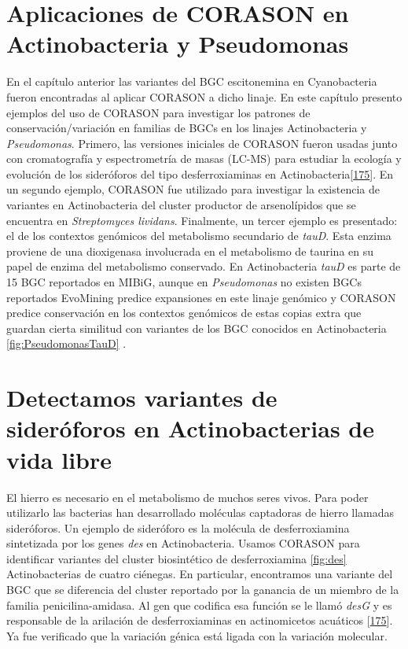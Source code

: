 \documentclass[12pt,twoside]{reedthesis}
\begin{document}
  \section{Aplicaciones de CORASON en Actinobacteria y
  Pseudomonas}\label{aplicaciones-de-corason-en-actinobacteria-y-pseudomonas}
  
  En el capítulo anterior las variantes del BGC escitonemina en
  Cyanobacteria fueron encontradas al aplicar CORASON a dicho linaje. En
  este capítulo presento ejemplos del uso de CORASON para investigar los
  patrones de conservación/variación en familias de BGCs en los linajes
  Actinobacteria y \emph{Pseudomonas}. Primero, las versiones iniciales de
  CORASON fueron usadas junto con cromatografía y espectrometría de masas
  (LC-MS) para estudiar la ecología y evolución de los sideróforos del
  tipo desferroxiaminas en
  Actinobacteria{[}\protect\hyperlink{ref-cruz-morales_actinobacteria_2017}{175}{]}.
  En un segundo ejemplo, CORASON fue utilizado para investigar la
  existencia de variantes en Actinobacteria del cluster productor de
  arsenolípidos que se encuentra en \emph{Streptomyces lividans}.
  Finalmente, un tercer ejemplo es presentado: el de los contextos
  genómicos del metabolismo secundario de \emph{tauD}. Esta enzima
  proviene de una dioxigenasa involucrada en el metabolismo de taurina en
  su papel de enzima del metabolismo conservado. En Actinobacteria
  \emph{tauD} es parte de 15 BGC reportados en MIBiG, aunque en
  \emph{Pseudomonas} no existen BGCs reportados EvoMining predice
  expansiones en este linaje genómico y CORASON predice conservación en
  los contextos genómicos de estas copias extra que guardan cierta
  similitud con variantes de los BGC conocidos en Actinobacteria
  \autoref{fig:PseudomonasTauD} .
  
  \section{Detectamos variantes de sideróforos en Actinobacterias de vida
  libre}\label{detectamos-variantes-de-sideroforos-en-actinobacterias-de-vida-libre}
  
  El hierro es necesario en el metabolismo de muchos seres vivos. Para
  poder utilizarlo las bacterias han desarrollado moléculas captadoras de
  hierro llamadas sideróforos. Un ejemplo de sideróforo es la molécula de
  desferroxiamina sintetizada por los genes \emph{des} en Actinobacteria.
  Usamos CORASON para identificar variantes del cluster biosintético de
  desferroxiamina \autoref{fig:des} Actinobacterias de cuatro ciénegas. En
  particular, encontramos una variante del BGC que se diferencia del
  cluster reportado por la ganancia de un miembro de la familia
  penicilina-amidasa. Al gen que codifica esa función se le llamó
  \emph{desG} y es responsable de la arilación de desferroxiaminas en
  actinomicetos acuáticos
  {[}\protect\hyperlink{ref-cruz-morales_actinobacteria_2017}{175}{]}. Ya
  fue verificado que la variación génica está ligada con la variación
  molecular.
  
\end{document}
